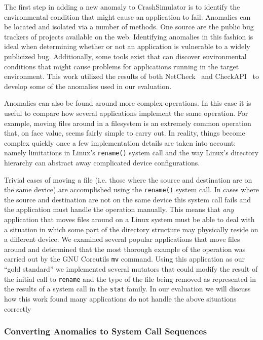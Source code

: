 The first step in adding a new anomaly to CrashSimulator is to identify the
environmental condition that might cause an application to fail.
Anomalies can be located and isolated via a number of methods. One source
are the public bug trackers of projects available on the web.
Identifying anomalies in this fashion is ideal when determining
whether or not an application is vulnerable to a widely publicized bug.
Additionally, some tools exist that can discover environmental conditions
that might cause problems
for applications
running in the target environment.  This
work utilized the results of both NetCheck~\cite{Zhuang_NSDI_2014} and
CheckAPI~\cite{rasley2015detecting}
to develop some of the
anomalies used in our evaluation.

Anomalies can also be found around more complex operations.  In this case
it is useful to compare how several applications implement the same
operation.  For example, moving files
around in a filesystem is an extremely common operation that, on face
value, seems fairly simple to carry out.  In reality, things become
complex quickly once a few implementation details are taken into account:
namely limitations in Linux's {\tt rename()} system call and the way
Linux's directory hierarchy can abstract away complicated device
configurations.

Trivial cases of moving a file (i.e. those where the source and destination
are on the same device) are accomplished using the {\tt rename()} system
call.  In cases where the source and destination are not on the same device
this system call fails and the application must handle the operation
manually. This means that \emph{any} application that moves files around on
a Linux system must be able to deal with a situation in which some part of
the directory structure may physically reside on a different device.
We examined several popular applications that move files around and
determined that the most thorough example of the operation was carried out
by
the GNU Coreutils {\tt mv} command.  Using this application as our
``gold standard''  we implemented several mutators that
could modify the result of the initial call to {\tt rename} and the
type of the file being removed as represented in the results of a system
call in the {\tt stat} family.
In our evaluation we will discuss how this work found many applications
do not handle the above situations correctly

\subsubsection{Converting Anomalies to System Call Sequences}

